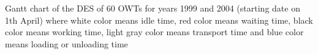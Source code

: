 \label{fig:gantt}
Gantt chart of the DES of 60 OWTs for years 1999 and 2004 (starting date on 1th April) where white color means idle time, red color means waiting time, black color means working time, light gray color means transport time and blue color means loading or unloading time